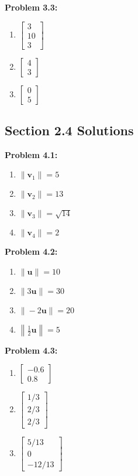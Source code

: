 \documentclass{article}
\begin{document}
\textbf{Problem 3.3:}
\begin{enumerate}
\item $\begin{bmatrix} 3 \\ 10 \\ 3 \end{bmatrix}$
\item $\begin{bmatrix} 4 \\ 3 \end{bmatrix}$
\item $\begin{bmatrix} 0 \\ 5 \end{bmatrix}$
\end{enumerate}

\subsection{Section 2.4 Solutions}

\textbf{Problem 4.1:}
\begin{enumerate}
\item $\|\mathbf{v}_1\| = 5$
\item $\|\mathbf{v}_2\| = 13$
\item $\|\mathbf{v}_3\| = \sqrt{14}$
\item $\|\mathbf{v}_4\| = 2$
\end{enumerate}

\textbf{Problem 4.2:}
\begin{enumerate}
\item $\|\mathbf{u}\| = 10$
\item $\|3\mathbf{u}\| = 30$
\item $\|-2\mathbf{u}\| = 20$
\item $\left\|\frac{1}{2}\mathbf{u}\right\| = 5$
\end{enumerate}

\textbf{Problem 4.3:}
\begin{enumerate}
\item $\begin{bmatrix} -0.6 \\ 0.8 \end{bmatrix}$
\item $\begin{bmatrix} 1/3 \\ 2/3 \\ 2/3 \end{bmatrix}$
\item $\begin{bmatrix} 5/13 \\ 0 \\ -12/13 \end{bmatrix}$
\end{enumerate}
\end{document}
